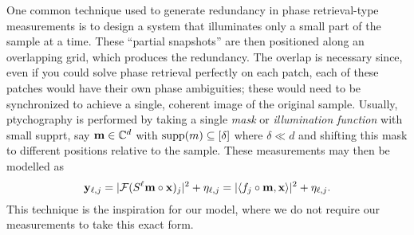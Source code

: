 One common technique used to generate redundancy in phase retrieval-type measurements is to design a system that illuminates only a small part of the sample at a time.  These ``partial snapshots'' are then positioned along an overlapping grid, which produces the redundancy.  The overlap is necessary since, even if you could solve phase retrieval perfectly on each patch, each of these patches would have their own phase ambiguities; these would need to be synchronized to achieve a single, coherent image of the original sample.  Usually, ptychography is performed by taking a single \emph{mask} or \emph{illumination function} with small supprt, say $\mathbf{m} \in \mathbb{C}^d$ with $\operatorname{supp}(m) \subseteq [\delta]$ where $\delta \ll d$ and shifting this mask to different positions relative to the sample. These measurements may then be modelled as \begin{equation} \mathbf{y}_{\ell, j} = |\mathcal{F}(S^\ell \mathbf{m} \circ \mathbf{x})_j|^2+ \eta_{\ell, j} = |\langle f_j \circ \mathbf{m}, \mathbf{x} \rangle|^2 + \eta_{\ell, j}. \label{eq:ptych_meas} \end{equation}  This technique is the inspiration for our model, where we do not require our measurements to take this exact form.
